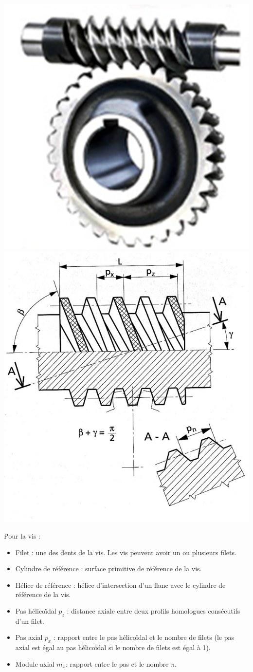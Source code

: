 \documentclass[11pt,oneside]{article}
\begin{document}
\begin{minipage}[c]{.3\linewidth}
\includegraphics[width=.8\textwidth]{png/fig_74}
\includegraphics[width=.8\textwidth]{png/fig_75}
\end{minipage}

Pour la vis :
\begin{itemize}
\item Filet : une des dents de la vis. Les vis peuvent avoir un ou plusieurs filets.
\item Cylindre de référence : surface primitive de référence de la vis.
\item Hélice de référence : hélice d’intersection d’un flanc avec le cylindre de référence de la vis.
\item Pas hélicoïdal $p_z$ : distance axiale entre deux profils homologues consécutifs d’un filet.
\item Pas axial $p_x$ : rapport entre le pas hélicoïdal et le nombre de filets (le pas axial est égal au pas hélicoïdal si le nombre de filets est égal à 1).
\item Module axial $m_x$: rapport entre le pas et le nombre $\pi$.
\end{itemize}
\end{document}

